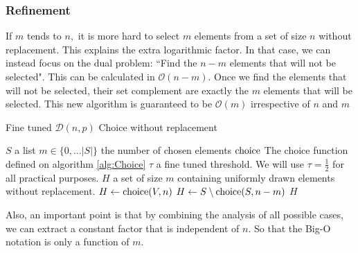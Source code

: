\subsubsection{Refinement}
If $m$ tends to $n,$ it is more hard to select $m$ elements from a set of size $n$ without replacement. This explains the extra logarithmic factor.
\newline In that case, we can instead focus on the dual problem: ``Find the $n-m$ elements that will not be selected". This can be calculated in $\mathcal{O}(n-m).$
\newline Once we find the elements that will not be selected, their set complement are exactly the $m$ elements that will be selected. This new algorithm is guaranteed to be $\mathcal{O}(m)$ irrespective of $n$ and $m$
\begin{algorithm}
	\caption{Fine tuned $\mathcal{D}(n,p)$ Choice without replacement }\label{alg:ChoiceFineTuned}
	\begin{algorithmic}
		\Require $S$ a list
		\Require $m\in\{0,\dots \lvert S \rvert\}$ the number of chosen elements
		\Require $\operatorname{choice}$ The choice function defined on algorithm \ref{alg:Choice}
		\Require $\tau$ a fine tuned threshold. We will use $\tau=\frac{1}{2}$ for all practical purposes.
		\Ensure $H$ a set of size $m$ containing uniformly drawn elements without replacement. 
			\State $H\leftarrow \operatorname{choice}(V,n)$
		\Else
			\State $H\leftarrow S\setminus \operatorname{choice}(S,n-m)$
		\EndIf
		\State \Return $H$
	\end{algorithmic}
\end{algorithm}
\FloatBarrier
Also, an important point is that by combining the analysis of all possible cases, we can extract a constant factor that is independent of $n.$ So that the Big-O notation is only a function of $m$.

